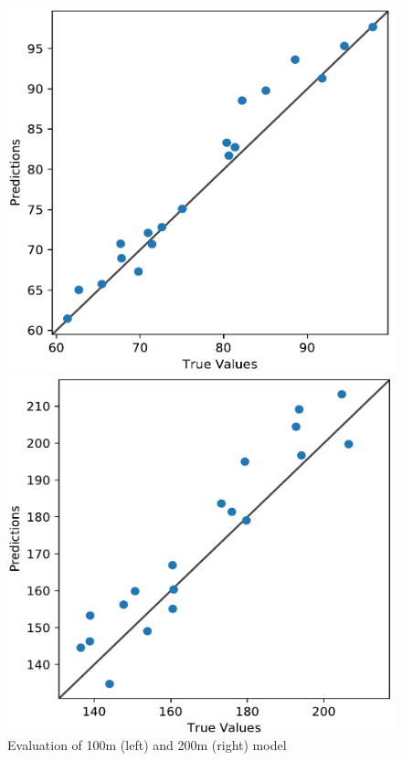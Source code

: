 \begin{figure}[ht]
    \begin{minipage}{0.23\textwidth}
    \includegraphics[width=\textwidth]{visualisation/eval_100m.png}
\end{minipage}
\begin{minipage}{0.23\textwidth}
    \includegraphics[width=\textwidth]{visualisation/eval_200m.png}
\end{minipage}
\caption{Evaluation of 100m (left) and 200m (right) model}
\label{fig:eval_model}
\end{figure}

